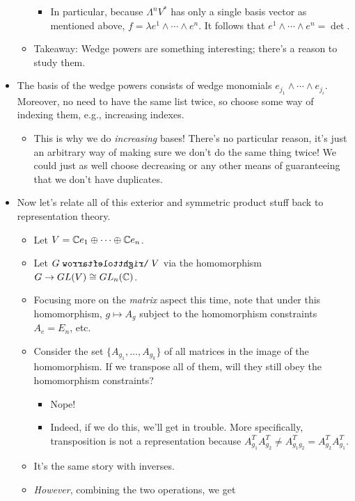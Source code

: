 \documentclass[../notes.tex]{subfiles}
\begin{document}
\begin{itemize}
\begin{itemize}
\begin{itemize}
            \item In particular, because $\Lambda^nV^*$ has only a single basis vector as mentioned above, $f=\lambda e^1\wedge\cdots\wedge e^n$. It follows that $e^1\wedge\cdots\wedge e^n=\det$.
        \end{itemize}
        \item Takeaway: Wedge powers are something interesting; there's a reason to study them.
    \end{itemize}
    \item The basis of the wedge powers consists of wedge monomials $e_{j_1}\wedge\cdots\wedge e_{j_i}$. Moreover, no need to have the same list twice, so choose some way of indexing them, e.g., increasing indexes.
    \begin{itemize}
        \item This is why we do \emph{increasing} bases! There's no particular reason, it's just an arbitrary way of making sure we don't do the same thing twice! We could just as well choose decreasing or any other means of guaranteeing that we don't have duplicates.
    \end{itemize}
    \item Now let's relate all of this exterior and symmetric product stuff back to representation theory.
    \begin{itemize}
        \item Let $V=\mathbb{C} e_1\oplus\cdots\oplus\mathbb{C} e_n$.
        \item Let $G\acts V$ via the homomorphism $G\to GL(V)\cong GL_n(\mathbb{C})$.
        \item Focusing more on the \emph{matrix} aspect this time, note that under this homomorphism, $g\mapsto A_g$ subject to the homomorphism constraints $A_e=E_n$, etc.
        \item Consider the set $\{A_{g_1},\dots,A_{g_k}\}$ of all matrices in the image of the homomorphism. If we transpose all of them, will they still obey the homomorphism constraints?
        \begin{itemize}
            \item Nope!
            \item Indeed, if we do this, we'll get in trouble. More specifically, transposition is not a representation because $A_{g_1}^TA_{g_2}^T\neq A_{g_1g_2}^T=A_{g_2}^TA_{g_1}^T$.
        \end{itemize}
        \item It's the same story with inverses.
        \item \emph{However}, combining the two operations, we get

\end{itemize}
\end{itemize}
\end{document}
